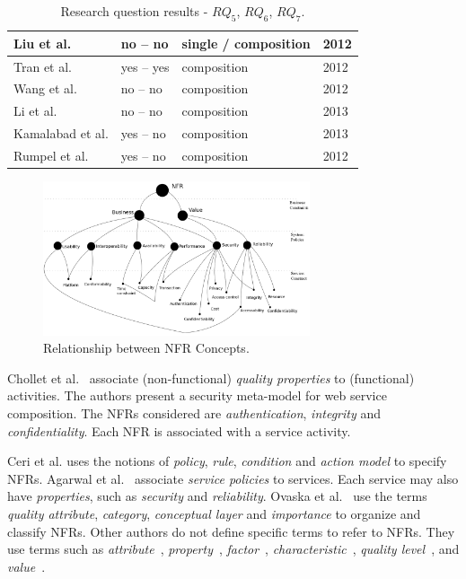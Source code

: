 \documentclass{sig-alternate}
\begin{document}
\begin{table}[ht!]
\begin{tabular}{l|l|l|l}
  \hline
   Liu et al. \cite{Liu20121080}  & no -- no & single / composition  &  
  2012\\
  \hline
  Tran et al. \cite{Tran2012531} & yes -- yes  & composition &  2012\\
  \hline
    Wang et al. \cite{Wang2012} & no -- no & composition &  2012 \\
  \hline
   Li et al. \cite{Li2013} & no -- no & composition 
  & 2013\\
  \hline
    Kamalabad et al. \cite{Kamalabad2012} & yes -- no &  composition 
  & 2013\\
  \hline
   Rumpel et al. \cite{Rumpel2012}  & yes -- no  & composition  & 2012\\
  \hline
  \hline  
\end{tabular}
\caption{Research question results - $RQ_5$, $RQ_6$, $RQ_7$.}
\label{tab:result03}
\end{table} 

\begin{figure}[ht!]  
\centering  
\includegraphics[width=0.70\textwidth]{figs/nfrRelationship.png}
\caption{Relationship between  NFR Concepts.}
\label{fig:nfr-relationship}   
\end{figure}  


Chollet et al.~\cite{CholletL09} associate (non-functional) \textit{quality properties} to 
(functional) activities. The authors present a security meta-model for web service
composition. The NFRs considered are \textit{authentication}, \textit{integrity} and \textit{confidentiality}. Each NFR is associated with a service activity.


Ceri et al.\cite{CeriDMF07} uses the notions of \textit{policy}, \textit{rule}, \textit{condition} and \textit{action model} to specify NFRs.
Agarwal et al.~\cite{AgarwalLS09} associate \textit{service policies} to services. 
Each service may also have \textit{properties}, such as \textit{security} and \textit{reliability}. 
Ovaska et al.~\cite{OvaskaEHPA10} use the terms \textit{quality attribute}, \textit{category}, \textit{conceptual layer} and \textit{importance} to organize and classify NFRs.
Other authors do not define specific terms to refer to NFRs. 
They use terms such as \textit{attribute}~\cite{ZhangPSP05,BasinDL06,JeongCL09}, 
\textit{property}~\cite{Fabra2011}, 
\textit{factor}~\cite{MohantyRP10,GutierrezRF10}, 
\textit{characteristic}~\cite{DiamadopoulouMPS08}, 
\textit{quality level}~\cite{ModicaTV09}, and
\textit{value}~\cite{ThissenW06,BasinDL06}.
\end{document}
